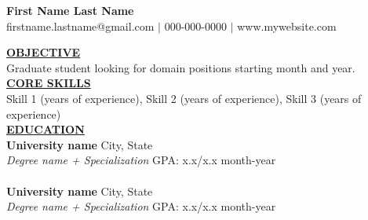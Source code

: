 \documentclass{article}
\begin{document}
	\begin{center}
		\thispagestyle{empty}
		\large \textbf{First Name Last Name \\}
		\normalsize firstname.lastname@gmail.com $\mid$ 000-000-0000 $\mid$ www.mywebsite.com    \\
		\hrulefill
	\end{center}
	
	
	\noindent \textbf{\underline{OBJECTIVE}} \\
	\noindent Graduate student looking for domain positions starting month and year. \\
	
	
	\noindent \textbf{\underline{CORE SKILLS}} \\
	Skill 1 (years of experience), Skill 2 (years of experience), Skill 3 (years of experience) \\
	
	\noindent \textbf{\underline{EDUCATION}} \\
	\textbf{University name} \hfill City, State \\
	\textit{Degree name + Specialization} \hfill GPA: x.x/x.x \hfill month-year \\ \\
	\textbf{University name} \hfill City, State \\
	\textit{Degree name + Specialization} \hfill GPA: x.x/x.x \hfill month-year \\
	
\end{document}
